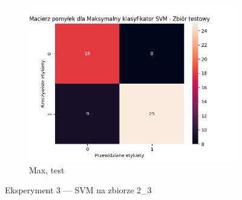 \documentclass[12pt]{article}
\newcommand*{\subfigwidth}{0.24\textwidth}
\begin{document}
\begin{figure}[H]
\begin{subfigure}[t]{\subfigwidth}
        \includegraphics[width=\linewidth]{img/exp_3/svm/2_3/max/test_matrix.png}
        \caption{Max, test}
    \end{subfigure}

    \caption{Eksperyment 3 --- SVM na zbiorze 2\_3}
\end{figure}
\clearpage
\end{document}
